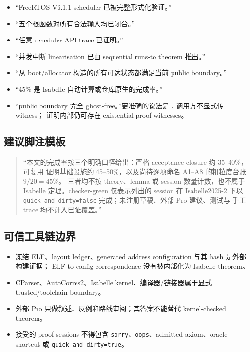 \documentclass[11pt,a4paper,UTF8]{ctexart}
\newcommand{\code}[1]{\nolinkurl{#1}}
\begin{document}
\begin{itemize}
  \item “FreeRTOS V6.1.1 scheduler 已被完整形式化验证。”
  \item “五个根函数对所有合法输入均已闭合。”
  \item “任意 scheduler API trace 已证明。”
  \item “并发中断 linearisation 已由 sequential runs-to theorem 推出。”
  \item “从 boot/allocator 构造的所有可达状态都满足当前 public boundary。”
  \item “45\% 是 Isabelle 自动计算或仓库原生的完成率。”
  \item “public boundary 完全 ghost-free。”更准确的说法是：调用方不显式传 witness；
        证明内部仍可存在 existential proof witnesses。
\end{itemize}

\subsection{建议脚注模板}

\begin{quote}\small
“本文的完成率按三个明确口径给出：严格 acceptance closure 约 35--40\%，可复用
证明基础设施约 45--50\%，以及尚待逐项命名 A1--A8 的粗粒度台账 $9/20=45\%$。
三者均不按 theory、lemma 或 session 数量计数，也不属于 Isabelle 定理。checker-green 仅表示列出的 session 在
Isabelle2025-2 下以 \code{quick_and_dirty=false} 完成；未注册草稿、外部 Pro 建议、测试与
手工 trace 均不计入已证覆盖。”
\end{quote}

\subsection{可信工具链边界}

\begin{itemize}
  \item 冻结 ELF、layout ledger、generated address configuration 与其 hash 是外部构建证据；
        ELF-to-config correspondence 没有被内部化为 Isabelle theorem。
  \item CParser、AutoCorres2、Isabelle kernel、编译器/链接器属于显式 trusted/toolchain boundary。
  \item 外部 Pro 只做叙述、反例和路线审阅；其答案不能替代 kernel-checked theorem。
  \item 接受的 proof sessions 不得包含 \code{sorry}、\code{oops}、admitted axiom、oracle
        shortcut 或 \code{quick_and_dirty=true}。
\end{itemize}
\end{document}
